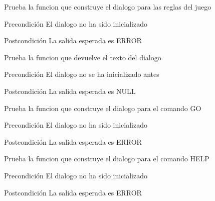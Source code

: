 \begin{DoxyRefList}
\item[\label{test__test000051}%
\hypertarget{test__test000051}{}%
Global \hyperlink{dialogue__test_8c_a764625c54d82bfa734d4b833d23403a8}{test2\-\_\-dialogue\-\_\-game\-\_\-rule} ()]Prueba la funcion que construye el dialogo para las reglas del juego \begin{DoxyPrecond}{Precondición}
El dialogo no ha sido inicializado 
\end{DoxyPrecond}
\begin{DoxyPostcond}{Postcondición}
La salida esperada es E\-R\-R\-O\-R  
\end{DoxyPostcond}

\item[\label{test__test000023}%
\hypertarget{test__test000023}{}%
Global \hyperlink{dialogue__test_8c_a6ab7465e80b710f2779314e7f3dd7729}{test2\-\_\-dialogue\-\_\-get\-\_\-text} ()]Prueba la funcion que devuelve el texto del dialogo \begin{DoxyPrecond}{Precondición}
El dialogo no se ha inicializado antes 
\end{DoxyPrecond}
\begin{DoxyPostcond}{Postcondición}
La salida esperada es N\-U\-L\-L  
\end{DoxyPostcond}

\item[\label{test__test000025}%
\hypertarget{test__test000025}{}%
Global \hyperlink{dialogue__test_8c_a3a241703ad12341b936a43023502894a}{test2\-\_\-dialogue\-\_\-go} ()]Prueba la funcion que construye el dialogo para el comando G\-O \begin{DoxyPrecond}{Precondición}
El dialogo no ha sido inicializado 
\end{DoxyPrecond}
\begin{DoxyPostcond}{Postcondición}
La salida esperada es E\-R\-R\-O\-R  
\end{DoxyPostcond}

\item[\label{test__test000049}%
\hypertarget{test__test000049}{}%
Global \hyperlink{dialogue__test_8c_a2ba272726000e6864cce83a8f773603b}{test2\-\_\-dialogue\-\_\-help} ()]Prueba la funcion que construye el dialogo para el comando H\-E\-L\-P \begin{DoxyPrecond}{Precondición}
El dialogo no ha sido inicializado 
\end{DoxyPrecond}
\begin{DoxyPostcond}{Postcondición}
La salida esperada es E\-R\-R\-O\-R  
\end{DoxyPostcond}


\end{DoxyRefList}
